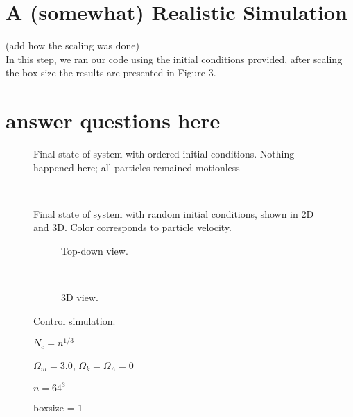\documentclass[10pt]{article}
\begin{document}
\section{A (somewhat) Realistic Simulation}
(add how the scaling was done)\\ 
	In this step, we ran our code using the initial conditions provided, after scaling the box size the results are presented in Figure 3.   
\section{answer questions here}
\begin{figure}[htbp]
\centering

\caption{Final state of system with ordered initial conditions. Nothing happened here; all particles remained motionless}
\end{figure}

\begin{figure}[htbp]
\centering
\begin{subfigure}{\textwidth}
\centering

\end{subfigure} \\
\begin{subfigure}{\textwidth}
\centering

\end{subfigure}
\caption{Final state of system with random initial conditions, shown in 2D and 3D. Color corresponds to particle velocity.}
\end{figure}

\begin{figure}[htbp]
\centering
\begin{subfigure}{\textwidth}
\centering

\caption{Top-down view.}
\end{subfigure} \\
\begin{subfigure}{\textwidth}
\centering

\caption{3D view.}
\end{subfigure}
\caption{Control simulation.}
\end{figure}

\begin{figure}[htbp]
\centering

\end{figure}

\begin{figure}[htbp]
\centering

\caption{$N_c = n^{1/3}$}
\end{figure}

\begin{figure}[htbp]
\centering

\caption{$\Omega_m = 3.0$, $\Omega_k = \Omega_\Lambda = 0$}
\end{figure}

\begin{figure}[htbp]
\centering

\caption{$n = 64^3$}
\end{figure}

\begin{figure}[htbp]
\centering

\caption{boxsize = 1}
\end{figure}
\end{document}
